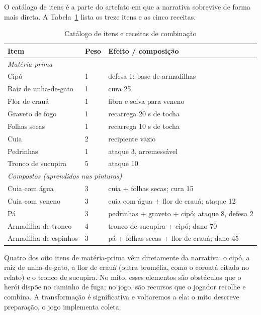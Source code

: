 \documentclass[conference]{IEEEtran}
\begin{document}
O catálogo de itens é a parte do artefato em que a narrativa sobrevive de forma mais
direta. A Tabela~\ref{tab:itens} lista os treze itens e as cinco receitas.

\begin{table}[t]
\caption{Catálogo de itens e receitas de combinação}
\label{tab:itens}
\centering
\footnotesize
\begin{tabular}{p{2.6cm}p{1.05cm}p{3.5cm}}
\toprule
\textbf{Item} & \textbf{Peso} & \textbf{Efeito / composição} \\
\midrule
\multicolumn{3}{l}{\textit{Matéria-prima}} \\
Cipó & 1 & defesa 1; base de armadilhas \\
Raiz de unha-de-gato & 1 & cura 25 \\
Flor de crauá & 1 & fibra e seiva para veneno \\
Graveto de fogo & 1 & recarrega 20 s de tocha \\
Folhas secas & 1 & recarrega 10 s de tocha \\
Cuia & 2 & recipiente vazio \\
Pedrinhas & 1 & ataque 3, arremessável \\
Tronco de sucupira & 5 & ataque 10 \\
\midrule
\multicolumn{3}{l}{\textit{Compostos (aprendidos nas pinturas)}} \\
Cuia com água & 3 & cuia + folhas secas; cura 15 \\
Cuia com veneno & 3 & cuia com água + flor de crauá; ataque 12 \\
Pá & 3 & pedrinhas + graveto + cipó; ataque 8, defesa 2 \\
Armadilha de tronco & 4 & tronco de sucupira + cipó; dano 70 \\
Armadilha de espinhos & 3 & pá + folhas secas + flor de crauá; dano 45 \\
\bottomrule
\end{tabular}
\end{table}

Quatro dos oito itens de matéria-prima vêm diretamente da narrativa: o cipó, a raiz de
unha-de-gato, a flor de crauá (outra bromélia, como o coroatá citado no relato) e o
tronco de sucupira. No mito, esses elementos são obstáculos que o herói dispõe no
caminho de fuga; no jogo, são recursos que o jogador recolhe e combina. A transformação
é significativa e voltaremos a ela: o mito descreve preparação, o jogo implementa
coleta.
\end{document}

